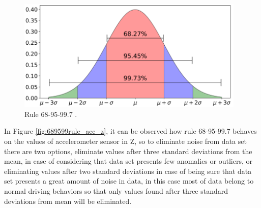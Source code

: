 \begin{figure}[h!]
  \begin{center}	\includegraphics[width=0.97\textwidth,frame]{imagenes/Cap3/68-95-99_rule}
  \caption{Rule 68-95-99.7 \protect\cite{Reference74}.}
  \label{fig:689599rule}
  \end{center}
\end{figure}

In Figure \ref{fig:689599rule_acc_z}, it can be observed how rule 68-95-99.7 behaves on the values of accelerometer sensor in Z, so to eliminate noise from data set there are two options, eliminate values after three standard deviations from the mean, in case of considering that data set presents few anomalies or outliers, or eliminating values after two standard deviations in case of being sure that data set presents a great amount of noise in data, in this case most of data belong to normal driving behaviors so that only values found after three standard deviations from mean will be eliminated.

